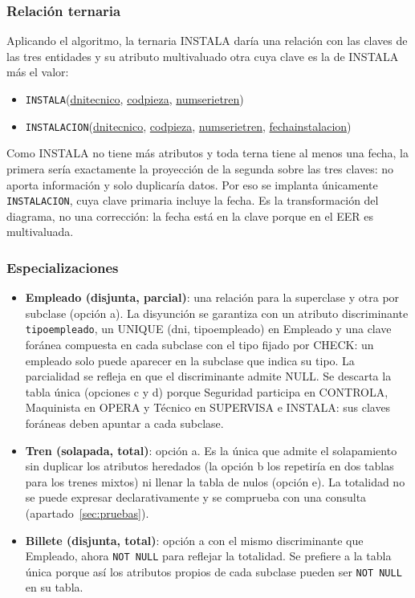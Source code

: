 \documentclass[11pt,a4paper]{article}
\DeclareRobustCommand{\_}{\textunderscore\allowbreak}
\newcommand{\tb}[1]{\texttt{#1}}
\begin{document}
\subsubsection*{Relación ternaria}
Aplicando el algoritmo, la ternaria INSTALA daría una relación con las claves de las tres entidades y su atributo multivaluado otra cuya clave es la de INSTALA más el valor:
\begin{itemize}
\item \tb{INSTALA}(\underline{dni\_tecnico}, \underline{cod\_pieza}, \underline{num\_serie\_tren})
\item \tb{INSTALACION}(\underline{dni\_tecnico}, \underline{cod\_pieza}, \underline{num\_serie\_tren}, \underline{fecha\_instalacion})
\end{itemize}
Como INSTALA no tiene más atributos y toda terna tiene al menos una fecha, la primera sería exactamente la proyección de la segunda sobre las tres claves: no aporta información y solo duplicaría datos. Por eso se implanta únicamente \tb{INSTALACION}, cuya clave primaria incluye la fecha. Es la transformación del diagrama, no una corrección: la fecha está en la clave porque en el EER es multivaluada.

\subsubsection*{Especializaciones}
\begin{itemize}
\item \textbf{Empleado (disjunta, parcial)}: una relación para la superclase y otra por subclase (opción a). La disyunción se garantiza con un atributo discriminante \tb{tipo\_empleado}, un UNIQUE (dni, tipo\_empleado) en Empleado y una clave foránea compuesta en cada subclase con el tipo fijado por CHECK: un empleado solo puede aparecer en la subclase que indica su tipo. La parcialidad se refleja en que el discriminante admite NULL. Se descarta la tabla única (opciones c y d) porque Seguridad participa en CONTROLA, Maquinista en OPERA y Técnico en SUPERVISA e INSTALA: sus claves foráneas deben apuntar a cada subclase.
\item \textbf{Tren (solapada, total)}: opción a. Es la única que admite el solapamiento sin duplicar los atributos heredados (la opción b los repetiría en dos tablas para los trenes mixtos) ni llenar la tabla de nulos (opción e). La totalidad no se puede expresar declarativamente y se comprueba con una consulta (apartado~\ref{sec:pruebas}).
\item \textbf{Billete (disjunta, total)}: opción a con el mismo discriminante que Empleado, ahora \tb{NOT NULL} para reflejar la totalidad. Se prefiere a la tabla única porque así los atributos propios de cada subclase pueden ser \tb{NOT NULL} en su tabla.
\end{itemize}
\end{document}
